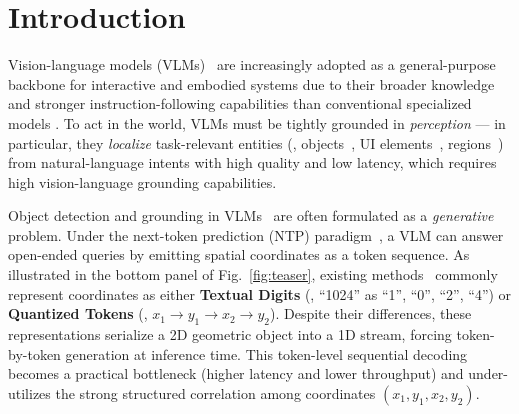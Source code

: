 \section{Introduction}
Vision-language models (VLMs)~\citep{bai2025qwen2.5vl, chen2025eagle, wang2025internvl3, huang2026step3, yang2025kwai, deshmukh2025nvidia} are increasingly adopted as a general-purpose backbone for interactive and embodied systems due to their broader knowledge and stronger instruction-following capabilities than conventional specialized models \citep{zhang2022dino, liu2023grounding, carion2020end, ren2016faster}. To act in the world, VLMs \citep{bai2025qwen2.5vl, fu2025llmdet, zhan2024griffon, wang2025internvl3, azzolini2025cosmos} must be tightly grounded in \emph{perception} — in particular, they \emph{localize} task-relevant entities (\eg, objects~\citep{zhang2024llava, jiang2025rexomni, yu2025perception, wang2023exploring}, UI elements~\citep{liu2025scalecua, lin2024showui, feizi2025grounding, nayak2025ui}, regions~\citep{ren2024pixellm, yuan2025pixelrefer, lai2024lisa, cheng2024spatialrgpt, ranzinger2024radio, heinrich2025radiov2}) from natural-language intents with high quality and low latency, which requires high vision-language grounding capabilities. 

Object detection and grounding in VLMs~\citep{zhan2024griffon, li2025lmmdet, yu2025perception, peng2023kosmos, zhang2024ferretv2, jiang2025rexomni, man2025locateanything3d} are often formulated as a \emph{generative} problem. Under the next-token prediction (NTP) paradigm~\citep{chen2021pix2seq, jiang2025rexomni, peng2023kosmos}, a VLM can answer open-ended queries by emitting spatial coordinates as a token sequence. As illustrated in the bottom panel of Fig.~\ref{fig:teaser}, existing methods~\citep{you2023ferret, peng2023kosmos, zhang2024ferretv2, jiang2025rexomni, qi2025cot4det} commonly represent coordinates as either \textbf{Textual Digits} (\eg, ``1024'' as ``1'', ``0'', ``2'', ``4'') or \textbf{Quantized Tokens} (\eg, \(x_1 \rightarrow y_1 \rightarrow x_2 \rightarrow y_2\)). Despite their differences, these representations serialize a 2D geometric object into a 1D stream, forcing token-by-token generation at inference time. This token-level sequential decoding becomes a practical bottleneck (higher latency and lower throughput) and under-utilizes the strong 
structured correlation among coordinates \((x_1, y_1, x_2, y_2)\). 


